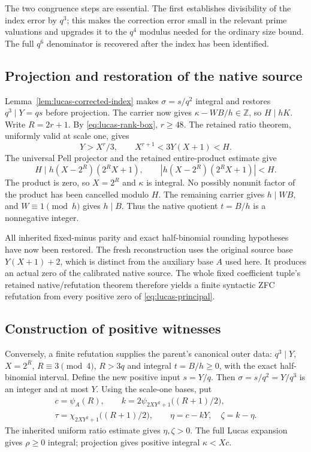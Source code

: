 The two congruence steps are essential.  The first establishes divisibility
of the index error by $q^3$; this makes the correction error small in the
relevant prime valuations and upgrades it to the $q^4$ modulus needed for
the ordinary size bound.  The full $q^6$ denominator is recovered after the
index has been identified.

\subsection{Projection and restoration of the native source}

Lemma~\ref{lem:lucas-corrected-index} makes $\sigma=s/q^2$ integral and
restores $q^3\mid Y=qs$ before projection.  The carrier now gives
$\kappa-WB/h\in\mathbb Z$, so $H\mid hK$.
Write $R=2r+1$.  By \eqref{eq:lucas-rank-box}, $r\ge48$.
The retained ratio theorem, uniformly valid at scale one, gives
\[
 Y>X^r/3,\qquad X^{r+1}<3Y(X+1)<H.
\]
The universal Pell projector and the retained entire-product estimate give
\[
 H\mid h(X-2^R)(2^RX+1),\qquad
 |h(X-2^R)(2^RX+1)|<H.
\]
The product is zero, so $X=2^R$ and $\kappa$ is integral.  No possibly
nonunit factor of the product has been cancelled modulo $H$.  The remaining
carrier gives $h\mid WB$, and $W\equiv1\pmod h$ gives $h\mid B$.
Thus the native quotient $t=B/h$ is a nonnegative integer.

All inherited fixed-minus parity and exact half-binomial rounding hypotheses
have now been restored.  The fresh reconstruction uses the original source
base $Y(X+1)+2$, which is distinct from the auxiliary base $A$ used here.
It produces an actual zero of the calibrated native source.  The whole fixed
coefficient tuple's retained native/refutation theorem therefore yields a
finite syntactic ZFC refutation from every positive zero of
\eqref{eq:lucas-principal}.

\subsection{Construction of positive witnesses}

Conversely, a finite refutation supplies the parent's canonical outer data:
$q^3\mid Y$, $X=2^R$, $R\equiv3\pmod4$, $R>3q$ and integral
$t=B/h\ge0$, with the exact half-binomial interval.  Define the new positive
input $s=Y/q$.  Then $\sigma=s/q^2=Y/q^3$ is an integer and at most $Y$.
Using the scale-one bases, put
\begin{gather*}
 c=\psi_A(R),\qquad
 k=2\psi_{2XY^2+1}\bigl((R+1)/2\bigr),\\
 \tau=\chi_{2XY^2+1}\bigl((R+1)/2\bigr),\qquad
 \eta=c-kY,\quad\zeta=k-\eta.
\end{gather*}
The inherited uniform ratio estimate gives $\eta,\zeta>0$.  The full
Lucas expansion gives $\rho\ge0$ integral; projection gives positive
integral $\kappa<Xc$.

